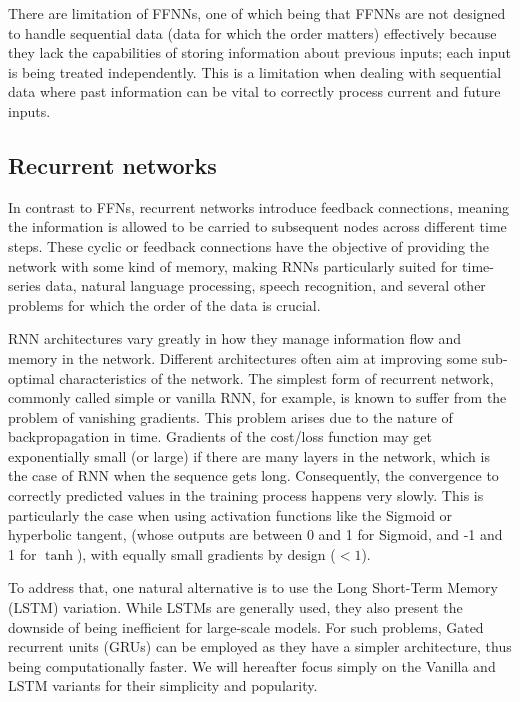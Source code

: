 There are limitation of FFNNs, one of which being that FFNNs are not designed to handle sequential data (data for which the order matters) effectively because they lack the capabilities of storing information about previous inputs; each input is being treated independently. This is a limitation when dealing with sequential data where past information can be vital to correctly process current and future inputs.

\subsection{Recurrent networks}

In contrast to FFNs, recurrent networks introduce feedback connections, meaning the information is allowed to be carried to subsequent nodes across different time steps. These cyclic or feedback connections have the objective of providing the network with some kind of memory, making RNNs particularly suited for time-series data, natural language processing, speech recognition, and several other problems for which the order of the data is crucial. 

RNN architectures vary greatly in how they manage information flow and memory in the network. Different architectures often aim at improving some sub-optimal characteristics of the network. The simplest form of recurrent network, commonly called simple or vanilla RNN, for example, is known to suffer from the problem of vanishing gradients.
This problem arises due to the nature of backpropagation in time. Gradients of the cost/loss function may get exponentially small (or large) if there are many layers in the network, which is the case of RNN when the sequence gets long. Consequently, the convergence to correctly predicted values in the training process happens very slowly. This is particularly the case when using activation functions like the Sigmoid or hyperbolic tangent, (whose outputs are between 0 and 1 for Sigmoid, and -1 and 1 for $\tanh$), with equally small gradients by design ($<1$).

To address that, one natural alternative is to use the Long Short-Term Memory (LSTM) variation. While LSTMs are generally used, they also present the downside of being inefficient for large-scale models. For such problems, Gated recurrent units (GRUs) can be employed as they have a simpler architecture, thus being computationally faster. We will hereafter focus simply on the Vanilla and LSTM variants for their simplicity and popularity.

